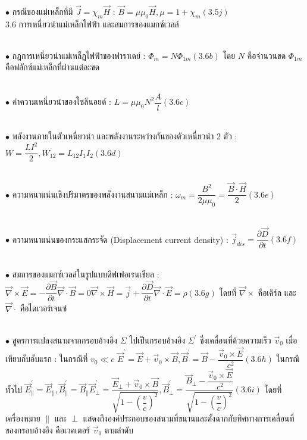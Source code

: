 \documentclass[a4paper,12pt]{article}
\begin{document}
~\\ $\bullet$ กรณีของแม่เหล็กที่มี $\vec{J} = \chi_{m}\vec{H}$ :
$\vec{B} = \mu\mu_{0}\vec{H} ,          \mu = 1+\chi_{m}                                             (3.5j)$~\\

3.6 การเหนี่ยวนำแม่เหล็กไฟฟ้า และสมการของแมกซ์เวลล์

~\\ $\bullet$ กฎการเหนี่ยวนำแม่เหล็ฏไฟฟ้าของฟาราเดย์ :
$\Phi_{m} = N\Phi_{1m}                                                  (3.6b)$
โดย $N$ คือจำนวนขด  $\Phi_{1m}$  คือฟลักซ์แม่เหล็กที่ผ่านแต่ละขด 

~\\ $\bullet$ ค่าความเหนี่ยวนำของโซลีนอยด์ :
$L = \mu\mu_{0}N^{2}\dfrac{A}{l}                                   (3.6c)$

~\\ $\bullet$ พลังงานภายในตัวเหนี่ยวนำ และพลังงานระหว่างกันของตัวเหนี่ยวนำ 2 ตัว :
$W = \dfrac{LI^{2}}{2} ,                 W_{12} = L_{12}I_{1}I_{2}                                (3.6d)$

~\\ $\bullet$ ความหนาแน่นเชิงปริมาตรของพลังงานสนามแม่เหล็ก :
$\omega_{m} = \dfrac{B^{2}}{2\mu\mu_{0}} = \dfrac{\vec{B}\cdot\vec{H}}{2}                     (3.6e)$

~\\ $\bullet$ ความหนาแน่นของกระแสกระจัด  (Displacement current density) :
$\vec{j}_{dis} = \dfrac{\partial \vec{D}}{\partial t}                                                      (3.6f)$

~\\ $\bullet$ สมการของแมกซ์เวลล์ในรูปแบบดิฟเฟอเรนเชียล :
$\vec{\nabla}\times\vec{E} = -\dfrac{\partial \vec{B}}{\partial t}
\vec{\nabla}\cdot\vec{B} = 0
\vec{\nabla}\times\vec{H} = \vec{j} + \dfrac{\partial \vec{D}}{\partial t}
\vec{\nabla}\cdot\vec{E} = \rho                                                                                   (3.6g)$
โดยที่ $\vec{\nabla}\times$  คือเคิร์ล   และ $\vec{\nabla}\cdot$ คือไดเวอร์เจนซ์

~\\ $\bullet$ สูตรการแปลงสนามจากกรอบอ้างอิง $\Sigma$  ไปเป็นกรอบอ้างอิง $\Sigma^\prime$ ซึ่งเคลื่อนที่ด้วยความเร็ว $\vec{v}_{0}$ เมื่อเทียบกับอับแรก :
ในกรณีที่ $v_{0} \ll c$
$\vec{E}^\prime = \vec{E} + \vec{v}_{0}\times\vec{B} ,              \vec{B}^\prime = \vec{B} - \dfrac{\vec{v}_{0}\times\vec{E}}{c^{2}}                                             (3.6h)$
ในกรณีทั่วไป
$\vec{E}^\prime_{\parallel } = \vec{E}_{\parallel} ,             \vec{B}^\prime_{\parallel} = \vec{B}_{\parallel}
\vec{E}^\prime_{\perp} = \dfrac{\vec{E}_{\perp} + \vec{v}_{0}\times\vec{B}}{\sqrt{1-(\dfrac{v}{c})^{2}}} ,                      \vec{B}^\prime_{\perp} = \dfrac{\vec{B}_{\perp}-\dfrac{\vec{v}_{0}\times\vec{E}}{c^{2}}}{\sqrt{1-(\dfrac{v}{c})^{2}}}                                                                     (3.6i)$
โดยที่เครื่องหมาย  $\parallel$  และ  $\perp$  แสดงถึงองค์ประกอบของสนามที่ขนานและตั้งฉากกับทิศทางการเคลื่อนที่ของกรอบอ้างอิง คือเวคเตอร์ $\vec{v}_{0}$ ตามลำดับ
\end{document}
